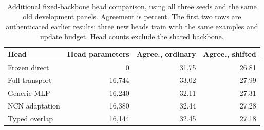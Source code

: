 \begin{table}[t]
\centering\small
\caption{Additional fixed-backbone head comparison, using all three seeds and the same old development panels. Agreement is percent. The first two rows are authenticated earlier results; three new heads train with the same examples and update budget. Head counts exclude the shared backbone.}
\begin{tabular}{lrrr}
\toprule
Head & Head parameters & Agree., ordinary & Agree., shifted \\
\midrule
Frozen direct & 0 & 31.75 & 26.81 \\
Full transport & 16,744 & 33.02 & 27.99 \\
Generic MLP & 16,240 & 32.11 & 27.31 \\
NCN adaptation & 16,380 & 32.44 & 27.28 \\
Typed overlap & 16,144 & 32.45 & 27.18 \\
\bottomrule
\end{tabular}
\end{table}
